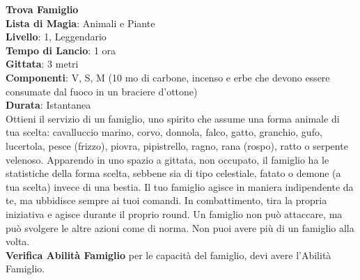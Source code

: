 \documentclass[a4paper,twoside,openany]{book}
\begin{document}
\begin{multicols}{2}
\medskip\textbf{Trova Famiglio}\\
\textbf{Lista di Magia}: Animali e Piante\\
\textbf{Livello}: 1, Leggendario\\
\textbf{Tempo di Lancio}: 1 ora\\
\textbf{Gittata}: 3 metri\\
\textbf{Componenti}: V, S, M (10 mo di carbone, incenso e erbe che devono essere consumate dal fuoco in un braciere d'ottone)\\
\textbf{Durata}: Istantanea\\
Ottieni il servizio di un famiglio, uno spirito che assume una forma animale di tua scelta: cavalluccio marino, corvo, donnola, falco, gatto, granchio, gufo, lucertola, pesce (frizzo), piovra, pipistrello, ragno, rana (rospo), ratto o serpente velenoso. Apparendo in uno spazio a gittata, non occupato, il famiglio ha le statistiche della forma scelta, sebbene sia di tipo celestiale, fatato o demone (a tua scelta) invece di una bestia. Il tuo famiglio agisce in maniera indipendente da te, ma ubbidisce sempre ai tuoi comandi. In combattimento, tira la propria iniziativa e agisce durante il proprio round. Un famiglio non può attaccare, ma può svolgere le altre azioni come di norma.
Non puoi avere più di un famiglio alla volta. \\
\textbf{Verifica Abilità Famiglio} per le capacità del famiglio, devi avere l'Abilità Famiglio.


\end{multicols}
\end{document}
